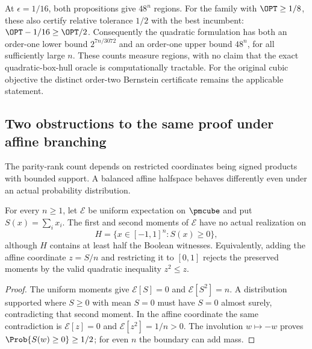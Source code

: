 At $\epsilon=1/16$, both propositions give $48^n$ regions. For the
family with $\OPT\ge1/8$, these also certify relative tolerance $1/2$
with the best incumbent: $\OPT-1/16\ge\OPT/2$. Consequently the
quadratic formulation has both an order-one lower bound
$2^{7n/3072}$ and an order-one upper bound $48^n$, for all sufficiently
large $n$. These counts measure regions, with no claim that the exact
quadratic-box-hull oracle is computationally tractable. For the original
cubic objective the distinct order-two Bernstein certificate remains the
applicable statement.

\subsection{Two obstructions to the same proof under affine branching}
The parity-rank count depends on restricted coordinates being signed
products with bounded support. A balanced affine halfspace behaves
differently even under an actual probability distribution.

\begin{proposition}
\label{prop:affine-quadratic-obstruction}
For every $n\ge1$, let $\mathcal E$ be uniform expectation on
$\pmcube$ and put $S(x)=\sum_i x_i$. The first and second moments of
$\mathcal E$ have no actual realization on
\[
 H=\{x\in[-1,1]^n:S(x)\ge0\},
\]
although $H$ contains at least half the Boolean witnesses. Equivalently,
adding the affine coordinate $z=S/n$ and restricting it to $[0,1]$
rejects the preserved moments by the valid quadratic inequality $z^2\le z$.
\end{proposition}
\begin{proof}
The uniform moments give $\mathcal E[S]=0$ and
$\mathcal E[S^2]=n$. A distribution supported where $S\ge0$ with
mean $S=0$ must have $S=0$ almost surely, contradicting that second
moment. In the affine coordinate the same contradiction is
$\mathcal E[z]=0$ and $\mathcal E[z^2]=1/n>0$.
The involution $w\mapsto-w$ proves $\Prob\{S(w)\ge0\}\ge1/2$;
for even $n$ the boundary can add mass.
\end{proof}

